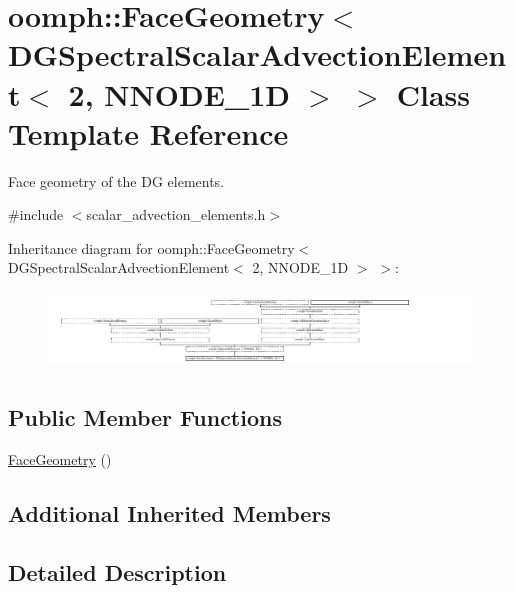 \hypertarget{classoomph_1_1FaceGeometry_3_01DGSpectralScalarAdvectionElement_3_012_00_01NNODE__1D_01_4_01_4}{}\section{oomph\+:\+:Face\+Geometry$<$ D\+G\+Spectral\+Scalar\+Advection\+Element$<$ 2, N\+N\+O\+D\+E\+\_\+1D $>$ $>$ Class Template Reference}
\label{classoomph_1_1FaceGeometry_3_01DGSpectralScalarAdvectionElement_3_012_00_01NNODE__1D_01_4_01_4}


Face geometry of the DG elements.  




{\ttfamily \#include $<$scalar\+\_\+advection\+\_\+elements.\+h$>$}

Inheritance diagram for oomph\+:\+:Face\+Geometry$<$ D\+G\+Spectral\+Scalar\+Advection\+Element$<$ 2, N\+N\+O\+D\+E\+\_\+1D $>$ $>$\+:\begin{figure}[H]
\begin{center}
\leavevmode
\includegraphics[height=2.037422cm]{classoomph_1_1FaceGeometry_3_01DGSpectralScalarAdvectionElement_3_012_00_01NNODE__1D_01_4_01_4}
\end{center}
\end{figure}
\subsection*{Public Member Functions}
\begin{DoxyCompactItemize}
\item 
\hyperlink{classoomph_1_1FaceGeometry_3_01DGSpectralScalarAdvectionElement_3_012_00_01NNODE__1D_01_4_01_4_ac156f6fea2c6496086473d1a0c888124}{Face\+Geometry} ()
\end{DoxyCompactItemize}
\subsection*{Additional Inherited Members}


\subsection{Detailed Description}
